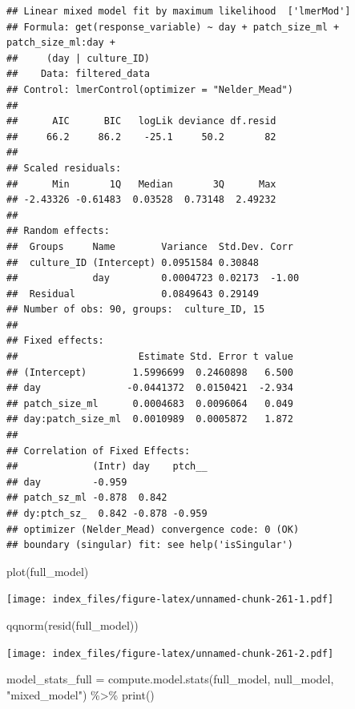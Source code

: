 \documentclass[
]{article}
\newenvironment{Shaded}{\begin{snugshade}}{\end{snugshade}}
\newcommand{\FunctionTok}[1]{\textcolor[rgb]{0.00,0.00,0.00}{#1}}
\newcommand{\NormalTok}[1]{#1}
\newcommand{\OtherTok}[1]{\textcolor[rgb]{0.56,0.35,0.01}{#1}}
\newcommand{\SpecialCharTok}[1]{\textcolor[rgb]{0.00,0.00,0.00}{#1}}
\newcommand{\StringTok}[1]{\textcolor[rgb]{0.31,0.60,0.02}{#1}}
\begin{document}
\begin{verbatim}
## Linear mixed model fit by maximum likelihood  ['lmerMod']
## Formula: get(response_variable) ~ day + patch_size_ml + patch_size_ml:day +  
##     (day | culture_ID)
##    Data: filtered_data
## Control: lmerControl(optimizer = "Nelder_Mead")
## 
##      AIC      BIC   logLik deviance df.resid 
##     66.2     86.2    -25.1     50.2       82 
## 
## Scaled residuals: 
##      Min       1Q   Median       3Q      Max 
## -2.43326 -0.61483  0.03528  0.73148  2.49232 
## 
## Random effects:
##  Groups     Name        Variance  Std.Dev. Corr 
##  culture_ID (Intercept) 0.0951584 0.30848       
##             day         0.0004723 0.02173  -1.00
##  Residual               0.0849643 0.29149       
## Number of obs: 90, groups:  culture_ID, 15
## 
## Fixed effects:
##                     Estimate Std. Error t value
## (Intercept)        1.5996699  0.2460898   6.500
## day               -0.0441372  0.0150421  -2.934
## patch_size_ml      0.0004683  0.0096064   0.049
## day:patch_size_ml  0.0010989  0.0005872   1.872
## 
## Correlation of Fixed Effects:
##             (Intr) day    ptch__
## day         -0.959              
## patch_sz_ml -0.878  0.842       
## dy:ptch_sz_  0.842 -0.878 -0.959
## optimizer (Nelder_Mead) convergence code: 0 (OK)
## boundary (singular) fit: see help('isSingular')
\end{verbatim}

\begin{Shaded}
\begin{Highlighting}[]
\FunctionTok{plot}\NormalTok{(full\_model)}
\end{Highlighting}
\end{Shaded}

\texttt{[image: index\_files/figure-latex/unnamed-chunk-261-1.pdf]}

\begin{Shaded}
\begin{Highlighting}[]
\FunctionTok{qqnorm}\NormalTok{(}\FunctionTok{resid}\NormalTok{(full\_model))}
\end{Highlighting}
\end{Shaded}

\texttt{[image: index\_files/figure-latex/unnamed-chunk-261-2.pdf]}

\begin{Shaded}
\begin{Highlighting}[]
\NormalTok{model\_stats\_full }\OtherTok{=} \FunctionTok{compute.model.stats}\NormalTok{(full\_model,}
\NormalTok{                                       null\_model,}
                                       \StringTok{"mixed\_model"}\NormalTok{) }\SpecialCharTok{\%\textgreater{}\%}
  \FunctionTok{print}\NormalTok{()}
\end{Highlighting}
\end{Shaded}
\end{document}
